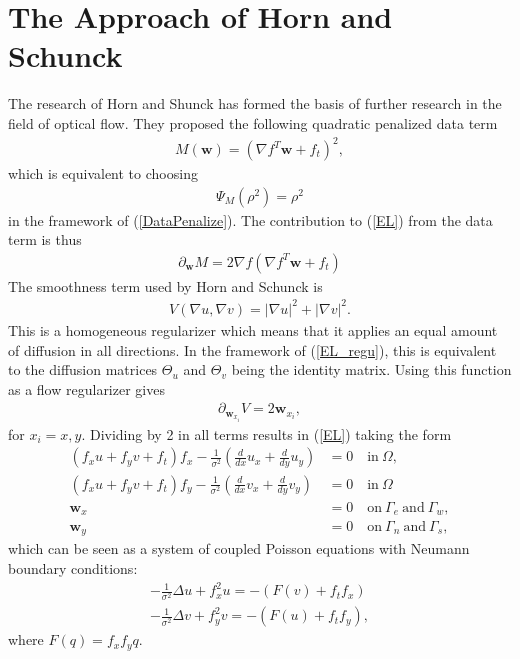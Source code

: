 \chapter{The Approach of Horn and Schunck}
The research of Horn and Shunck has formed the basis of further research in the field of optical flow. They proposed the following quadratic penalized data term
\begin{align}
M(\textbf{w}) = (\nabla f^T \textbf{w} + f_t)^2,
\end{align}
which is equivalent to choosing
\begin{align*}
\Psi_M(\rho^2) = \rho^2
\end{align*}
in the framework of (\ref{DataPenalize}). The contribution to (\ref{EL}) from the data term is thus 
\begin{equation}
\begin{aligned}
\partial_{\textbf{w}} M = 2\nabla f(\nabla f ^T  \textbf{w} + f_t)
\end{aligned}
\end{equation}
The smoothness term used by Horn and Schunck is
\begin{align*}
V(\nabla u, \nabla v) = |\nabla u|^2 + |\nabla v|^2.
\end{align*}
This is a homogeneous regularizer which means that it applies an equal amount of diffusion in all directions. In the framework of (\ref{EL_regu}), this is equivalent to the diffusion matrices $\Theta_u$ and $\Theta_v$ being the identity matrix. Using this function as a flow regularizer gives
\begin{align*}
\partial_ {\textbf{w}_{x_i}} V = 2\textbf{w}_{x_i},
\end{align*}
for $x_i = x, y$. Dividing by 2 in all terms results in (\ref{EL}) taking the form 
\begin{equation}
\label{EL_HS}
\begin{aligned}
(f_x u + f_y v + f_t) f_x - \frac{1}{\sigma^2}(\frac{d}{d x} u_x + \frac{d}{d y} u_y ) &= 0  \quad \text{in} \ \Omega,  \\
(f_x u + f_y v + f_t) f_y - \frac{1}{\sigma^2}(\frac{d}{d x} v_x + \frac{d}{d y} v_y ) &= 0  \quad \text{in} \ \Omega  \\
\textbf{w}_{x} &= 0 \quad \text{on} \ \Gamma_e \ \text{and} \ \Gamma_w, \\
\textbf{w}_{y} &= 0 \quad \text{on} \ \Gamma_n \ \text{and} \ \Gamma_s,
\end{aligned}
\end{equation}
which can be seen as a system of coupled Poisson equations with Neumann boundary conditions:
\begin{align*}
-\frac{1}{\sigma^2} \Delta u + f_x ^2 u = - (F(v) + f_tf_x) \\
-\frac{1}{\sigma^2} \Delta v + f_y ^2 v = - (F(u) + f_tf_y) ,
\end{align*}
where $F(q) = f_xf_y q$.


